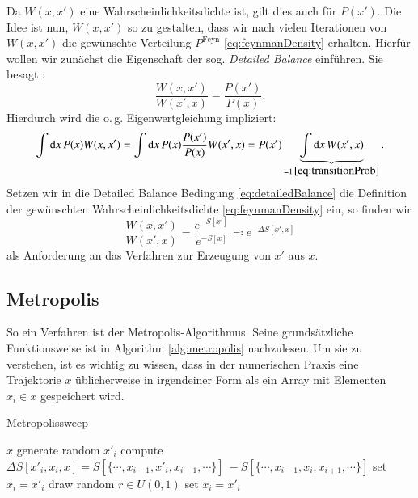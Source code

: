 Da $W(x,x')$ eine
Wahrscheinlichkeitsdichte ist, gilt dies auch für $P(x')$. Die Idee ist
nun, $W(x,x')$ so zu gestalten, dass wir nach vielen Iterationen von $W(x,x')$
die gewünschte Verteilung $P^\text{Feyn}$ \eqref{eq:feynmanDensity} erhalten.
Hierfür wollen wir zunächst die Eigenschaft der sog. \emph{Detailed Balance}
einführen. Sie besagt \cite{freedmanCreutz}:
\begin{equation} \label{eq:detailedBalance}
\frac{W(x,x')}{W(x',x)} = \frac{P(x')}{P(x)}.
\end{equation}
Hierdurch wird die o.\,g. Eigenwertgleichung impliziert:
\[
\int \dd{x} P(x) W(x,x') = \int \dd{x} P(x) \frac{P(x')}{P(x)} W(x',x)
= P(x') \underbrace{\int \dd{x} W(x',x)}_{= 1 \, \eqref{eq:transitionProb}}.
\]
Setzen wir in die Detailed Balance Bedingung \eqref{eq:detailedBalance} die
Definition der gewünschten Wahrscheinlichkeitsdichte \eqref{eq:feynmanDensity}
ein, so finden wir
\[
\frac{W(x,x')}{W(x',x)} = \frac{e^{-S[x']}}{e^{-S[x]}}
\eqqcolon e^{-\Delta S[x',x]}
\]
als Anforderung an das Verfahren zur Erzeugung von $x'$ aus $x$.

\subsection{Metropolis} \label{sec:metropolis}
So ein Verfahren ist der Metropolis-Algorithmus. Seine grundsätzliche Funktionsweise
ist in Algorithm \ref{alg:metropolis} nachzulesen. Um sie zu verstehen,
ist es wichtig zu wissen, dass in der numerischen Praxis eine Trajektorie $x$
üblicherweise in irgendeiner Form als ein Array mit Elementen $x_i \in x$ gespeichert
wird.

\begin{algorithm}
    \caption{Metropolissweep} \label{alg:metropolis}
\begin{algorithmic}[0]
    \REQUIRE $x$
        \STATE generate random $x'_i$
        \STATE compute
        $\Delta S[x'_i, x_i, x] = S[\{\cdots, x_{i-1}, x'_i, x_{i+1}, \cdots\}]\
        - S[\{\cdots, x_{i-1}, x_i, x_{i+1}, \cdots\}]$
            \STATE set $x_i = x'_i$
        \ELSE
            \STATE draw random $r \in U(0,1)$
                \STATE set $x_i = x'_i$
            \ENDIF
        \ENDIF
    \ENDFOR
\end{algorithmic}
\end{algorithm}

